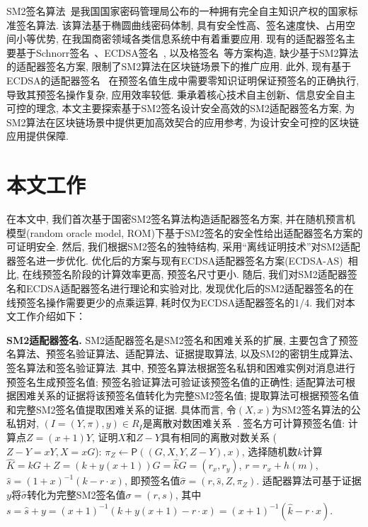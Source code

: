 \documentclass[review]{jcr}
\begin{document}
SM2签名算法~\cite{SM2,SM2-survey}是我国国家密码管理局公布的一种拥有完全自主知识产权的国家标准签名算法. 该算法基于椭圆曲线密码体制, 具有安全性高、签名速度快、占用空间小等优势, 在我国商密领域各类信息系统中有着重要应用. 现有的适配器签名主要基于Schnorr签名~\cite{Sch89,Poelstra2016,AumayrEEFHMMR20,ErwigFHMR2021}、ECDSA签名~\cite{ECDSA,rfc6605,AumayrEEFHMMR20,PA18}, 以及格签名~\cite{DucasLLSSS2018,EsginEE20}等方案构造, 缺少基于SM2算法的适配器签名方案, 限制了SM2算法在区块链场景下的推广应用. 此外, 现有基于ECDSA的适配器签名~\cite{AumayrEEFHMMR20} 在预签名值生成中需要零知识证明保证预签名的正确执行, 导致其预签名操作复杂, 应用效率较低. 秉承着核心技术自主创新、信息安全自主可控的理念, 本文主要探索基于SM2签名设计安全高效的SM2适配器签名方案, 为SM2算法在区块链场景中提供更加高效契合的应用参考, 为设计安全可控的区块链应用提供保障. 


\section{本文工作}  

在本文中, 我们首次基于国密SM2签名算法构造适配器签名方案, 并在随机预言机模型(random oracle model, ROM)下基于SM2签名的安全性给出适配器签名方案的可证明安全. 然后, 我们根据SM2签名的独特结构, 采用``离线证明技术''对SM2适配器签名进一步优化. 优化后的方案与现有ECDSA适配器签名方案(ECDSA-AS)~\cite{AumayrEEFHMMR20}相比, 在线预签名阶段的计算效率更高, 预签名尺寸更小. 随后, 我们对SM2适配器签名和ECDSA适配器签名进行理论和实验对比, 发现优化后的SM2适配器签名的在线预签名操作需要更少的点乘运算, 耗时仅为ECDSA适配器签名的1/4. 我们对本文工作介绍如下：

\begin{trivlist}
\item \textbf{SM2适配器签名.} SM2适配器签名是SM2签名和困难关系的扩展, 主要包含了预签名算法、预签名验证算法、适配算法、证据提取算法, 以及SM2的密钥生成算法、签名算法和签名验证算法. 其中, 预签名算法根据签名私钥和困难实例对消息进行预签名生成预签名值; 预签名验证算法可验证该预签名值的正确性; 适配算法可根据困难关系的证据将该预签名值转化为完整SM2签名值; 提取算法可根据预签名值和完整SM2签名值提取困难关系的证据. 具体而言, 令$(X,x)$为SM2签名算法的公私钥对, $(I=(Y,\pi),y)\in R_I$是离散对数困难关系~\cite{AumayrEEFHMMR20}. 签名方可计算预签名值: 计算点$Z=(x+1)Y$, 证明$X$和$Z-Y$具有相同的离散对数关系 ($Z-Y=xY, X=xG$): $\pi_Z\leftarrow \mathsf{P}((G,X,Y,Z-Y),x)$, 选择随机数$k$计算$\hat{K}=kG+Z=(k+y(x+1))G=\hat{k}G=(r_x,r_y)$, $r=r_x+h(m)$, $\hat{s}=(1+x)^{-1}(k-r\cdot x)$, 即预签名值$\hat{\sigma}=(r,\hat{s},Z,\pi_Z)$. 适配器算法可基于证据$y$将$\hat{\sigma}$转化为完整SM2签名值$\sigma=(r,s)$, 其中$s=\hat{s}+y=(x+1)^{-1}(k+y(x+1)-r\cdot x)=(x+1)^{-1}(\hat{k}-r\cdot x)$. 
\end{trivlist}
\end{document}
